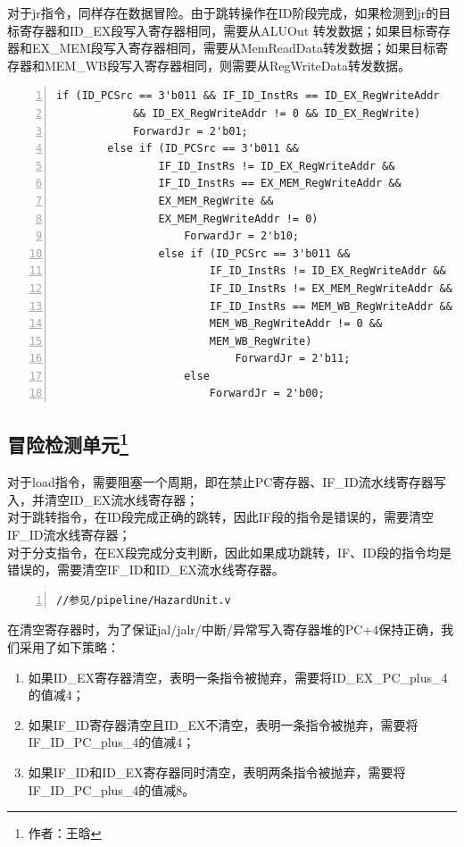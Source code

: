 \documentclass{article}
\begin{document}
            对于jr指令，同样存在数据冒险。由于跳转操作在ID阶段完成，如果检测到jr的目标寄存器和ID\_EX段写入寄存器相同，需要从ALUOut 转发数据；如果目标寄存器和EX\_MEM段写入寄存器相同，需要从MemReadData转发数据；如果目标寄存器和MEM\_WB段写入寄存器相同，则需要从RegWriteData转发数据。
            \begin{Verbatim}[frame=lines,numbers=left,stepnumber=5,label={ForwardUnit.v}]
        if (ID_PCSrc == 3'b011 && IF_ID_InstRs == ID_EX_RegWriteAddr
            && ID_EX_RegWriteAddr != 0 && ID_EX_RegWrite)
            ForwardJr = 2'b01;
        else if (ID_PCSrc == 3'b011 &&
                IF_ID_InstRs != ID_EX_RegWriteAddr &&
                IF_ID_InstRs == EX_MEM_RegWriteAddr &&
                EX_MEM_RegWrite &&
                EX_MEM_RegWriteAddr != 0)
                    ForwardJr = 2'b10;
                else if (ID_PCSrc == 3'b011 &&
                        IF_ID_InstRs != ID_EX_RegWriteAddr &&
                        IF_ID_InstRs != EX_MEM_RegWriteAddr &&
                        IF_ID_InstRs == MEM_WB_RegWriteAddr &&
                        MEM_WB_RegWriteAddr != 0 &&
                        MEM_WB_RegWrite)
                            ForwardJr = 2'b11;
                    else
                        ForwardJr = 2'b00;
            \end{Verbatim}

        \subsection{冒险检测单元\protect\footnote{作者：王晗}}
            对于load指令，需要阻塞一个周期，即在禁止PC寄存器、IF\_ID流水线寄存器写入，并清空ID\_EX流水线寄存器；\\
            对于跳转指令，在ID段完成正确的跳转，因此IF段的指令是错误的，需要清空IF\_ID流水线寄存器；\\
            对于分支指令，在EX段完成分支判断，因此如果成功跳转，IF、ID段的指令均是错误的，需要清空IF\_ID和ID\_EX流水线寄存器。
            \begin{Verbatim}[frame=lines,numbers=left,stepnumber=5,label={HazardUnit.v}]
    //参见/pipeline/HazardUnit.v
            \end{Verbatim}

            在清空寄存器时，为了保证jal/jalr/中断/异常写入寄存器堆的PC+4保持正确，我们采用了如下策略：
            \begin{enumerate}
              \item 如果ID\_EX寄存器清空，表明一条指令被抛弃，需要将ID\_EX\_PC\_plus\_4的值减4；
              \item 如果IF\_ID寄存器清空且ID\_EX不清空，表明一条指令被抛弃，需要将IF\_ID\_PC\_plus\_4的值减4；
              \item 如果IF\_ID和ID\_EX寄存器同时清空，表明两条指令被抛弃，需要将IF\_ID\_PC\_plus\_4的值减8。
            \end{enumerate}
\end{document}
